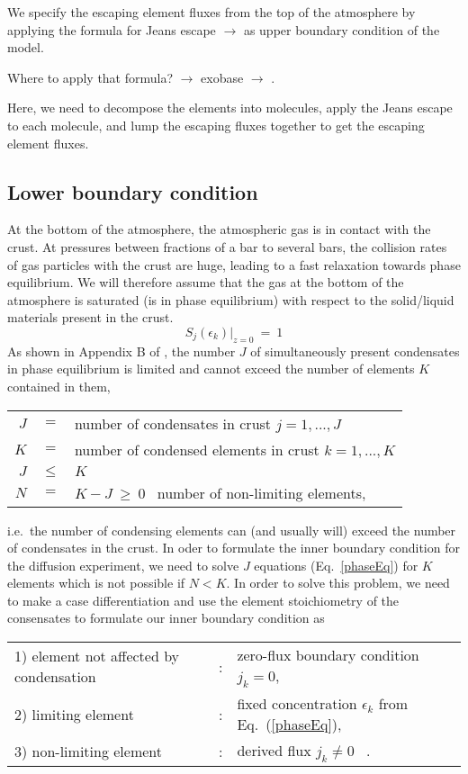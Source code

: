\documentclass[11pt]{article}
\def\ek{\epsilon_k}
\begin{document}
We specify the escaping element fluxes from the top of the atmosphere 
by applying the formula for Jeans escape $\to$ \citet{Tian2015} as
upper boundary condition of the model.

\noindent Where to apply that formula? $\to$ exobase $\to$ \citet{Volkov2011}.

\noindent Here, we need to decompose the elements into molecules,
apply the Jeans escape to each molecule, and lump the escaping fluxes
together to get the escaping element fluxes. 

\subsection{Lower boundary condition}
\label{LowerBound}

At the bottom of the atmosphere, the atmospheric gas is in contact
with the crust. At pressures between fractions of a bar to
several bars, the collision rates of gas particles with the crust are
huge, leading to a fast relaxation towards phase equilibrium.  We will
therefore assume that the gas at the bottom of the atmosphere is
saturated (is in phase equilibrium) with respect to the solid/liquid 
materials present in the crust.
\begin{equation}
  S_j(\ek)\Big|_{z=0} ~=~ 1
  \label{phaseEq}
\end{equation}
As shown in Appendix B of \citep{Woitke2017}, the number $J$ of
simultaneously present condensates in phase equilibrium is limited
and cannot exceed the number of elements $K$ contained in them,\\
\begin{center}
\begin{tabular}{rcl}
  $J$ &$=$& number of condensates in crust $j=1,...,J$\\
  $K$ &$=$& number of condensed elements in crust $k=1,...,K$ \\
  $J$ &$\leq$ & $K$ \\
  $N$ &$=$& $K-J~\geq~0$ ~number of non-limiting elements,
\end{tabular}
\end{center} 
i.e.\ the number of condensing elements can (and usually will) exceed
the number of condensates in the crust. In oder to formulate the inner
boundary condition for the diffusion experiment, we need to solve $J$
equations (Eq.~\ref{phaseEq}) for $K$ elements which is not possible
if $N<K$. In order to solve this problem, we need to make a case
differentiation and use the element stoichiometry of the consensates
to formulate our inner boundary condition as
\begin{center}
\begin{tabular}{lcl}
  1) element not affected by condensation &:& zero-flux boundary
                                              condition $j_k=0$,\\
  2) limiting element &:& fixed concentration $\ek$ from
            Eq.~(\ref{phaseEq}),\\
  3) non-limiting element &:& derived flux $j_k\neq0$  \ .
\end{tabular}
\end{center}
\end{document}
